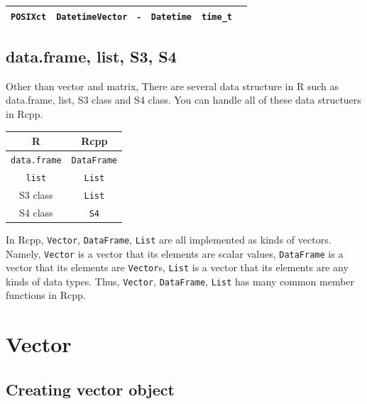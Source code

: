 \documentclass[]{book}
\begin{document}
\begin{longtable}[]{@{}cccccc@{}}
\begin{minipage}[t]{0.14\columnwidth}
\texttt{POSIXct}\strut
\end{minipage} & \begin{minipage}[t]{0.14\columnwidth}\centering
\texttt{DatetimeVector}\strut
\end{minipage} & \begin{minipage}[t]{0.14\columnwidth}\centering
-\strut
\end{minipage} & \begin{minipage}[t]{0.14\columnwidth}\centering
\texttt{Datetime}\strut
\end{minipage} & \begin{minipage}[t]{0.14\columnwidth}\centering
\texttt{time\_t}\strut
\end{minipage}\tabularnewline
\bottomrule
\end{longtable}

\hypertarget{data.frame-list-s3-s4}{%
\section{data.frame, list, S3, S4}\label{data.frame-list-s3-s4}}

Other than vector and matrix, There are several data structure in R such as data.frame, list, S3 class and S4 class. You can handle all of these data structuers in Rcpp.

\begin{longtable}[]{@{}cc@{}}
\toprule
R & Rcpp\tabularnewline
\midrule
\endhead
\texttt{data.frame} & \texttt{DataFrame}\tabularnewline
\texttt{list} & \texttt{List}\tabularnewline
S3 class & \texttt{List}\tabularnewline
S4 class & \texttt{S4}\tabularnewline
\bottomrule
\end{longtable}

In Rcpp, \texttt{Vector}, \texttt{DataFrame}, \texttt{List} are all implemented as kinds of vectors. Namely, \texttt{Vector} is a vector that its elements are scalar values, \texttt{DataFrame} is a vector that its elements are \texttt{Vector}s, \texttt{List} is a vector that its elements are any kinds of data types. Thus, \texttt{Vector}, \texttt{DataFrame}, \texttt{List} has many common member functions in Rcpp.

\hypertarget{vector}{%
\chapter{Vector}\label{vector}}

\hypertarget{creating-vector-object}{%
\section{Creating vector object}\label{creating-vector-object}}
\end{document}

